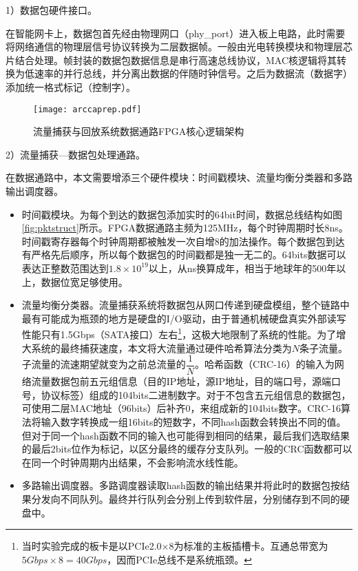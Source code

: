 1）数据包硬件接口。

在智能网卡上，数据包首先经由物理网口（phy\_port）进入板上电路，此时需要将网络通信的物理层信号协议转换为二层数据帧。一般由光电转换模块和物理层芯片结合处理。帧封装的数据包数据信息是串行高速总线协议，MAC核逻辑将其转换为低速率的并行总线，并分离出数据的伴随时钟信号。之后为数据流（数据字）添加统一格式标记（控制字）。

\begin{figure}[!ht]
	\centering
	\texttt{[image: arccaprep.pdf]}
	\caption{流量捕获与回放系统数据通路FPGA核心逻辑架构} \label{fig:arccaprep}
\end{figure}

2）流量捕获---数据包处理通路。

在数据通路中，本文需要增添三个硬件模块：时间戳模块、流量均衡分类器和多路输出调度器。

\begin{itemize}
	\item 时间戳模块。为每个到达的数据包添加实时的64bit时间，数据总线结构如图\ref{fig:pktstruct}所示。FPGA数据通路主频为125MHz，每个时钟周期时长8ns。时间戳寄存器每个时钟周期都被触发一次自增8的加法操作。每个数据包到达有严格先后顺序，所以每个数据包的时间戳都是独一无二的。64bits数据可以表达正整数范围达到$1.8\times10^{19}$以上，从ns换算成年，相当于地球年的500年以上，数据位宽足够使用。
	\item 流量均衡分类器。流量捕获系统将数据包从网口传递到硬盘模组，整个链路中最有可能成为瓶颈的地方是硬盘的I/O驱动，由于普通机械硬盘真实外部读写性能只有1.5Gbps（SATA接口）左右\footnote{当时实验完成的板卡是以PCIe2.0$ \times $8为标准的主板插槽卡。互通总带宽为$ 5Gbps\times 8=40Gbps $，因而PCIe总线不是系统瓶颈。}，这极大地限制了系统的性能。为了增大系统的最终捕获速度，本文将大流量通过硬件哈希算法分类为$N$条子流量。子流量的流速期望就变为之前总流量的$\dfrac{1}{N}$。哈希函数（CRC-16）的输入为网络流量数据包前五元组信息（目的IP地址，源IP地址，目的端口号，源端口号，协议标签）组成的104bits二进制数字。对于不包含五元组信息的数据包，可使用二层MAC地址（96bits）后补齐0，来组成新的104bits数字。CRC-16算法将输入数字转换成一组16bits的短数字，不同hash函数会转换出不同的值。但对于同一个hash函数不同的输入也可能得到相同的结果，最后我们选取结果的最后2bits位作为标记，以区分最终的缓存分支队列。一般的CRC函数都可以在同一个时钟周期内出结果，不会影响流水线性能。
	\item 多路输出调度器。多路调度器读取hash函数的输出结果并将此时的数据包按结果分发向不同队列。最终并行队列会分别上传到软件层，分别储存到不同的硬盘中。

\end{itemize}

